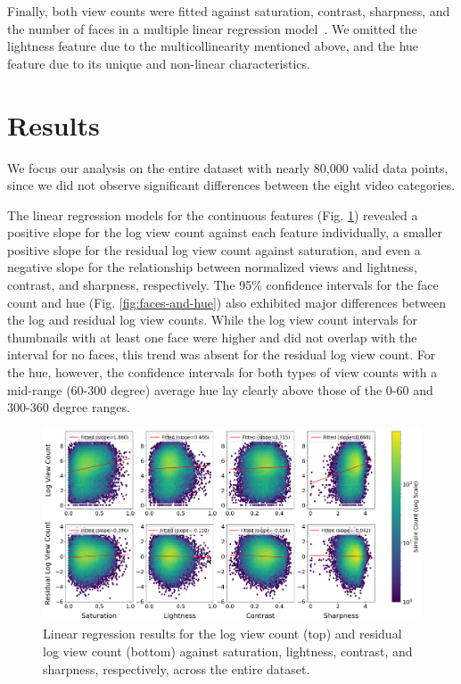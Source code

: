 \documentclass{article}
\begin{document}
Finally, both view counts were fitted against saturation, contrast, sharpness, and the number of faces in a multiple linear regression model~\cite{seabold2010statsmodels}. We omitted the lightness feature due to the multicollinearity mentioned above, and the hue feature due to its unique and non-linear characteristics.

\section{Results}
We focus our analysis on the entire dataset with nearly 80,000 valid data points, since we did not observe significant differences between the eight video categories.

The linear regression models for the continuous features (Fig. \ref{fig:lr}) revealed a positive slope for the log view count against each feature individually, a smaller positive slope for the residual log view count against saturation, and even a negative slope for the relationship between normalized views and lightness, contrast, and sharpness, respectively. The 95\% confidence intervals for the face count and hue (Fig. \ref{fig:faces-and-hue}) also exhibited major differences between the log and residual log view counts. While the log view count intervals for thumbnails with at least one face were higher and did not overlap with the interval for no faces, this trend was absent for the residual log view count. For the hue, however, the confidence intervals for both types of view counts with a mid-range (60-300 degree) average hue lay clearly above those of the 0-60 and 300-360 degree ranges.

\begin{figure}[h]


  \centering
  \includegraphics[width=\textwidth]{figs/lr.png}
  \caption{Linear regression results for the log view count (top) and residual log view count (bottom) against saturation, lightness, contrast, and sharpness, respectively, across the entire dataset.}
  \label{fig:lr}
\end{figure}
\end{document}
